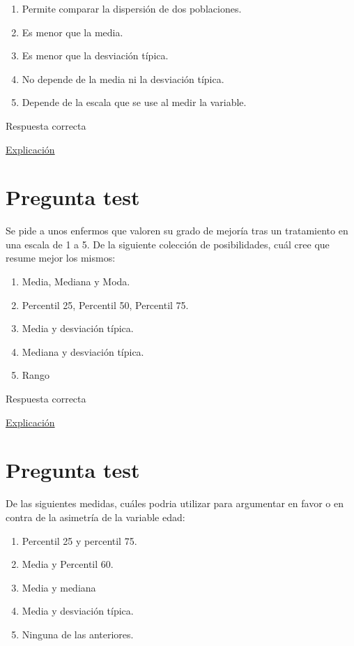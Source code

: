 \documentclass[
]{book}
\providecommand{\tightlist}{%
  \setlength{\itemsep}{0pt}\setlength{\parskip}{0pt}}
\begin{document}
\begin{enumerate}
\def\labelenumi{\alph{enumi})}
\tightlist
\item
  Permite comparar la dispersión de dos poblaciones.
\item
  Es menor que la media.
\item
  Es menor que la desviación típica.
\item
  No depende de la media ni la desviación típica.
\item
  Depende de la escala que se use al medir la variable.
\end{enumerate}

Respuesta correcta

\href{https://en.wikipedia.org/wiki/Coefficient_of_variation}{Explicación}

\hypertarget{pregunta-test-56}{%
\section{Pregunta test}\label{pregunta-test-56}}

Se pide a unos enfermos que valoren su grado de mejoría tras un tratamiento en una escala de 1 a 5. De la siguiente colección de posibilidades, cuál cree que resume mejor los mismos:

\begin{enumerate}
\def\labelenumi{\alph{enumi})}
\tightlist
\item
  Media, Mediana y Moda.
\item
  Percentil 25, Percentil 50, Percentil 75.
\item
  Media y desviación típica.
\item
  Mediana y desviación típica.
\item
  Rango
\end{enumerate}

Respuesta correcta

\href{https://1fjmanzano.github.io/bioestadistica/medidas-de-posicio\%CC\%81n-dispersio\%CC\%81n-y-forma.html\#medidas-de-dispersio\%CC\%81n}{Explicación}

\hypertarget{pregunta-test-57}{%
\section{Pregunta test}\label{pregunta-test-57}}

De las siguientes medidas, cuáles podria utilizar para argumentar en favor o en contra de la asimetría de la variable edad:

\begin{enumerate}
\def\labelenumi{\alph{enumi})}
\tightlist
\item
  Percentil 25 y percentil 75.
\item
  Media y Percentil 60.
\item
  Media y mediana
\item
  Media y desviación típica.
\item
  Ninguna de las anteriores.
\end{enumerate}
\end{document}
